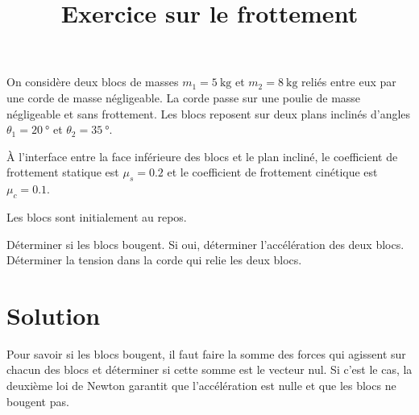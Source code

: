 \documentclass{tufte-handout}
\title{Exercice sur le frottement}
\date{}
\begin{document}
\maketitle
\vspace{0.5cm}

On considère deux blocs de masses $m_1 = \SI{5}{\kilogram}$ et $m_2 =
\SI{8}{\kilogram}$ reliés entre eux par une corde de masse négligeable.  La
corde passe sur une poulie de masse négligeable et sans frottement.  Les blocs
reposent sur deux plans inclinés d'angles $\theta_1 = \SI{20}{\degree}$ et
$\theta_2 = \SI{35}{\degree}$.

À l'interface entre la face inférieure des blocs et le plan incliné, le
coefficient de frottement statique est $\mu_s = \num{0.2}$ et le coefficient de
frottement cinétique est $\mu_c = \num{0.1}$.

Les blocs sont initialement au repos.

\begin{marginfigure}
\end{marginfigure}

Déterminer si les blocs bougent.  Si oui, déterminer l'accélération des deux
blocs.  Déterminer la tension dans la corde qui relie les deux blocs.

\section{Solution}

Pour savoir si les blocs bougent, il faut faire la somme des forces qui
agissent sur chacun des blocs et déterminer si cette somme est le vecteur nul.
Si c'est le cas, la deuxième loi de Newton garantit que l'accélération est
nulle et que les blocs ne bougent pas.
\end{document}
